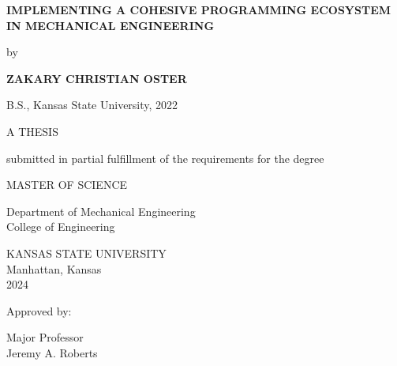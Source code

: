 \begin{titlepage}
    \begin{center}
 
        \textbf{IMPLEMENTING A COHESIVE PROGRAMMING ECOSYSTEM IN MECHANICAL ENGINEERING}
 
        \vspace{1cm}
         by
             
        \vspace{1cm}
        \textbf{ZAKARY CHRISTIAN OSTER}
 
        \vspace{1cm}
        B.S., Kansas State University, 2022
             
        \vspace{1cm}
        A THESIS
             
        \vspace{1cm}
        submitted in partial fulfillment of the requirements for the degree
 
        \vspace{1cm}
        MASTER OF SCIENCE
 
        \vspace{1cm}
        Department of Mechanical Engineering\\
        College of Engineering
      
        \vspace{1.5cm}
             
        KANSAS STATE UNIVERSITY\\
        Manhattan, Kansas\\
        2024
    \end{center}
 
    \begin{flushright}
        Approved by:
 
        \vspace{1.5cm}
        Major Professor\\
        Jeremy A. Roberts
    \end{flushright}
 \end{titlepage}